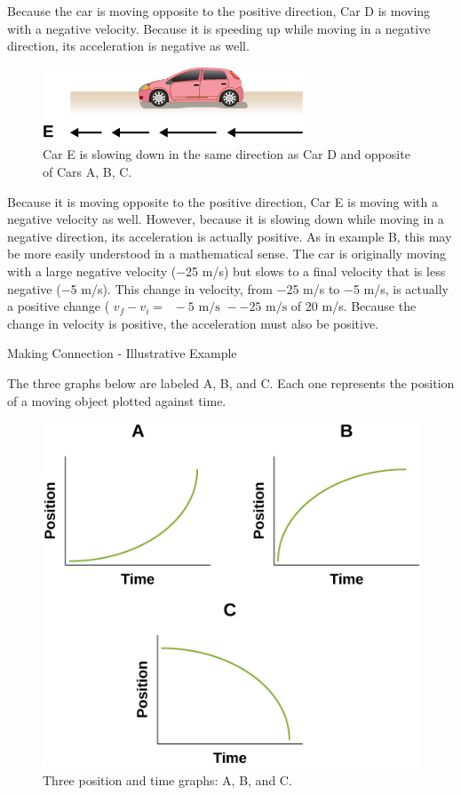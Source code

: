\documentclass[
]{book}
\begin{document}
Because the car is moving opposite to the positive direction, Car D is
moving with a negative velocity. Because it is speeding up while moving
in a negative direction, its acceleration is negative as well.

\begin{figure}
\hypertarget{fs-id1956758}{%
\centering
\includegraphics{images/Figure_Ch2_M4_06.jpg}
\caption{Car E is slowing down in the same direction as Car D and opposite of
Cars A, B, C.}\label{fs-id1956758}
}
\end{figure}

Because it is moving opposite to the positive direction, Car E is moving
with a negative velocity as well. However, because it is slowing down
while moving in a negative direction, its acceleration is actually
positive. As in example B, this may be more easily understood in a
mathematical sense. The car is originally moving with a large negative
velocity (−25 m/s) but slows to a final velocity that is less negative
(−5 m/s). This change in velocity, from −25 m/s to −5 m/s, is actually a
positive change (
\(v_{f} - v_{i} = \operatorname{} - 5\text{~m/s~} - - 25\text{~m/s}\) of
20 m/s. Because the change in velocity is positive, the acceleration
must also be positive.

\hypertarget{fs-id1050890}{}
Making Connection - Illustrative Example

The three graphs below are labeled A, B, and C. Each one represents the
position of a moving object plotted against time.

\begin{figure}
\hypertarget{fs-id2024196}{%
\centering
\includegraphics{images/CNX_APPhysics_02_M4_graphoverv.jpg}
\caption{Three position and time graphs: A, B, and
C.}\label{fs-id2024196}
}
\end{figure}
\end{document}
